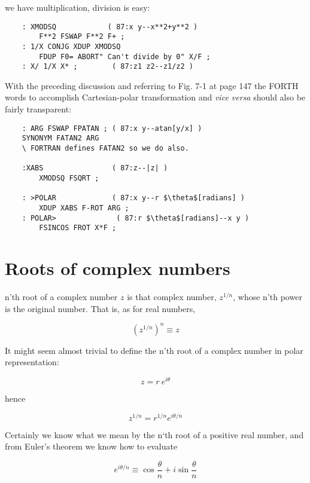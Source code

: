  we have multiplication, division is easy:

\begin{lstlisting}
    : XMODSQ            ( 87:x y--x**2+y**2 )
        F**2 FSWAP F**2 F+ ;
    : 1/X CONJG XDUP XMODSQ
        FDUP F0= ABORT" Can't divide by 0" X/F ;
    : X/ 1/X X* ;        ( 87:z1 z2--z1/z2 )
\end{lstlisting}

With the preceding discussion and referring to Fig. 7-1 at page 147 the FORTH words to accomplish Cartesian-polar transformation and \textit{vice versa} should also be fairly transparent:

\begin{lstlisting}
    : ARG FSWAP FPATAN ; ( 87:x y--atan[y/x] )
    SYNONYM FATAN2 ARG
    \ FORTRAN defines FATAN2 so we do also.

    :XABS                ( 87:z--|z| )
        XMODSQ FSQRT ;

    : >POLAR             ( 87:x y--r $\theta$[radians] )
        XDUP XABS F-ROT ARG ;
    : POLAR>              ( 87:r $\theta$[radians]--x y )
        FSINCOS FROT X*F ;
\end{lstlisting}

\section{Roots of complex numbers}
 n'th root of a complex number $z$ is that complex number, $z^{1/n}$, whose n'th power is the original number. That is, as for real numbers,

\begin{equation}
  \left(z^{1/n}\right)^n \equiv z
\end{equation}

It might seem almost trivial to define the n’th root of a complex number in polar representation:

\begin{equation}
  z = r\ e^{i\theta}
\end{equation}

hence

\begin{equation}
  z^{1/n} = r^{1/n} e^{i\theta/n}
  \label{eq:07_20}
\end{equation}

Certainly we know what we mean by the n‘th root of a positive real number, and from Euler’s theorem we know how to evaluate

\begin{equation}
  e^{i\theta/n} \equiv \cos\frac{\theta}{n} + i \sin\frac{\theta}{n}
\end{equation}

